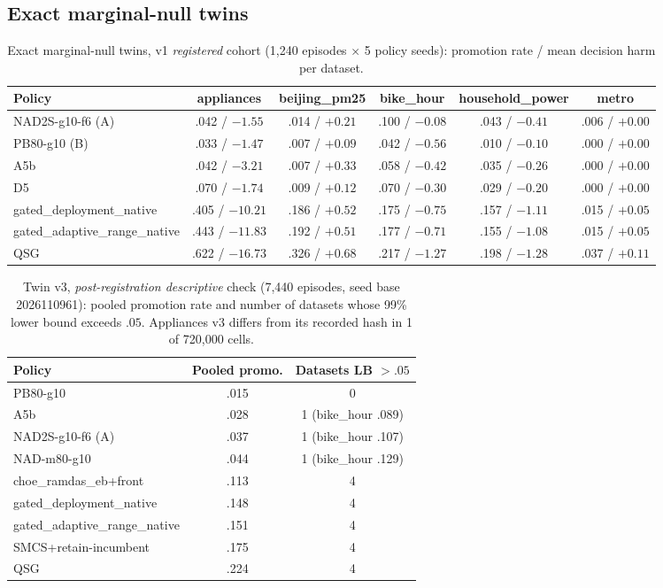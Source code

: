 \subsection{Exact marginal-null twins}

\begin{table}[t]
\caption{Exact marginal-null twins, v1 \emph{registered} cohort (1{,}240 episodes $\times$ 5 policy seeds): promotion rate / mean decision harm per dataset.}\label{tab:twins}
\centering\small
\begin{tabular}{@{}lccccc@{}}
\toprule
Policy & appliances & beijing\_pm25 & bike\_hour & household\_power & metro \\
\midrule
NAD2S-g10-f6 (A) & .042 / $-1.55$ & .014 / $+0.21$ & .100 / $-0.08$ & .043 / $-0.41$ & .006 / $+0.00$ \\
PB80-g10 (B) & .033 / $-1.47$ & .007 / $+0.09$ & .042 / $-0.56$ & .010 / $-0.10$ & .000 / $+0.00$ \\
A5b & .042 / $-3.21$ & .007 / $+0.33$ & .058 / $-0.42$ & .035 / $-0.26$ & .000 / $+0.00$ \\
D5 & .070 / $-1.74$ & .009 / $+0.12$ & .070 / $-0.30$ & .029 / $-0.20$ & .000 / $+0.00$ \\
gated\_deployment\_native & .405 / $-10.21$ & .186 / $+0.52$ & .175 / $-0.75$ & .157 / $-1.11$ & .015 / $+0.05$ \\
gated\_adaptive\_range\_native & .443 / $-11.83$ & .192 / $+0.51$ & .177 / $-0.71$ & .155 / $-1.08$ & .015 / $+0.05$ \\
QSG & .622 / $-16.73$ & .326 / $+0.68$ & .217 / $-1.27$ & .198 / $-1.28$ & .037 / $+0.11$ \\
\bottomrule
\end{tabular}
\end{table}

\begin{table}[t]
\caption{Twin v3, \emph{post-registration descriptive} check (7{,}440 episodes, seed base 2026110961): pooled promotion rate and number of datasets whose 99\% lower bound exceeds $.05$. Appliances v3 differs from its recorded hash in 1 of 720{,}000 cells.}\label{tab:twinv3}
\centering\small
\begin{tabular}{@{}lcc@{}}
\toprule
Policy & Pooled promo. & Datasets LB $>.05$ \\
\midrule
PB80-g10 & .015 & 0 \\
A5b & .028 & 1 (bike\_hour .089) \\
NAD2S-g10-f6 (A) & .037 & 1 (bike\_hour .107) \\
NAD-m80-g10 & .044 & 1 (bike\_hour .129) \\
choe\_ramdas\_eb+front & .113 & 4 \\
gated\_deployment\_native & .148 & 4 \\
gated\_adaptive\_range\_native & .151 & 4 \\
SMCS+retain-incumbent & .175 & 4 \\
QSG & .224 & 4 \\
\bottomrule
\end{tabular}
\end{table}

